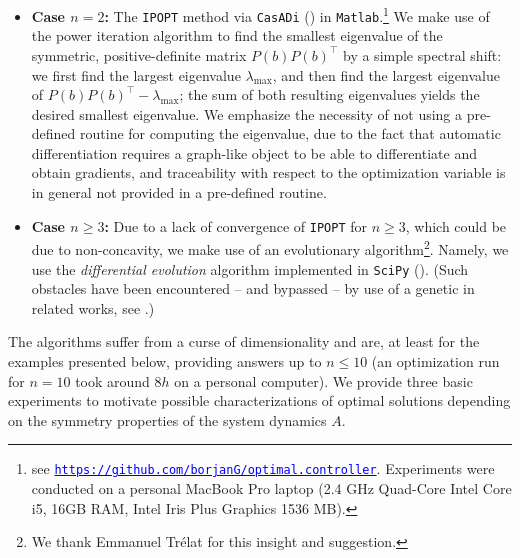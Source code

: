\documentclass[journal,twoside,web]{ieeecolor}
\begin{document}
	\begin{itemize}
	\item \textbf{Case $n=2$:} The \texttt{IPOPT} method via \texttt{CasADi} (\cite{andersson2019casadi}) in \texttt{Matlab}.\footnote{see \href{https://github.com/borjanG/optimal.controller}{\textcolor{blue}{\texttt{https://github.com/borjanG/optimal.controller}}}. Experiments were conducted on a personal MacBook Pro laptop (2.4 GHz Quad-Core Intel Core i5, 16GB RAM, Intel Iris Plus Graphics 1536 MB).}
	We make use of the power iteration algorithm to find the smallest eigenvalue of the symmetric, positive-definite matrix $P(b)P(b)^\top$ by a simple spectral shift: we first find the largest eigenvalue $\lambda_{\max}$, and then find the largest eigenvalue of $P(b)P(b)^\top-\lambda_{\max}$; the sum of both resulting eigenvalues yields the desired smallest eigenvalue. We emphasize the necessity of not using a pre-defined routine for computing the eigenvalue, due to the fact that automatic differentiation requires a graph-like object to be able to differentiate and obtain gradients, and traceability with respect to the optimization variable is in general not provided in a pre-defined routine. 
	\smallskip 
	
	\item \textbf{Case $n\geqslant3$:} Due to a lack of convergence of \texttt{IPOPT} for $n\geqslant3$, which could be due to non-concavity, we make use of an evolutionary algorithm\footnote{We thank Emmanuel Trélat for this insight and suggestion.}. Namely, we use the \emph{differential evolution} algorithm implemented in \texttt{SciPy} (\cite{storn1997differential}). (Such obstacles have been encountered -- and bypassed -- by use of a genetic in related works, see \cite{hebrard2003optimal, freitas1999optimizing}.)
	\end{itemize} 
	
	\noindent
	The algorithms suffer from a curse of dimensionality and are, at least for the  examples presented below, providing answers up to $n\leqslant10$ (an optimization run for $n=10$ took around $8h$ on a personal computer). We provide three basic experiments to motivate possible characterizations of optimal solutions depending on the symmetry properties of the system dynamics $A$. 
	\medskip
	
\end{document}
